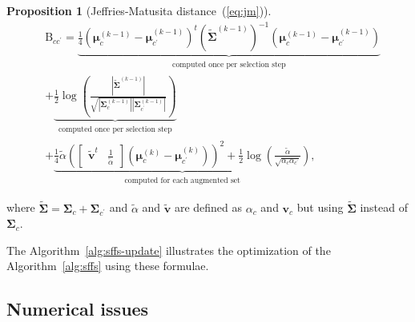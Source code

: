 \documentclass[journal,10pt]{IEEEtran}
\newtheorem{prop}{Proposition}
\begin{document}
      \begin{prop}[Jeffries-Matusita distance~(\ref{eq:jm})]
      \begin{align}
        \label{eq:jm-update}
            &\text{B}_{cc^\prime} = \underbrace{\frac{1}{4} (\boldsymbol{\mu}_c^{(k-1)} - \boldsymbol{\mu}_{c^\prime}^{(k-1)})^t ( \boldsymbol{\tilde{\Sigma}}^{(k-1)} )^{-1} (\boldsymbol{\mu}_c^{(k-1)} - \boldsymbol{\mu}_{c^\prime}^{(k-1)})}_{\substack{\text{computed once per selection step}}} \nonumber \\
            &+ \underbrace{\frac{1}{2} \log \left( \frac{|\boldsymbol{\tilde{\Sigma}}^{(k-1)}|}{\sqrt{|\boldsymbol{\Sigma}_c^{(k-1)}| |\boldsymbol{\Sigma}_{c^\prime}^{(k-1)}|}} \right)}_{\substack{\text{computed once per selection step}}} \nonumber \\
            &+ \underbrace{\frac{1}{4} \tilde{\alpha} ( \left[\begin{array}{cc} \mathbf{\tilde{v}}^t & \frac{1}{\tilde{\alpha}} \end{array}\right] (\boldsymbol{\mu}_c^{(k)} - \boldsymbol{\mu}_{c^\prime}^{(k)}) )^2 + \frac{1}{2} \log \left( \frac{\tilde{\alpha}}{\sqrt{\alpha_c \alpha_{c^\prime}}} \right)}_{\substack{\text{computed for each augmented set}}},
      \end{align}
    \end{prop}
    \noindent where $\boldsymbol{\tilde{\Sigma}} = \boldsymbol{\Sigma}_c + \boldsymbol{\Sigma}_{c^\prime}$ and $\tilde{\alpha}$ and $\mathbf{\tilde{v}}$ are defined as $\alpha_c$ and $\mathbf{v}_c$ but using $\boldsymbol{\tilde{\Sigma}}$ instead of $\boldsymbol{\Sigma}_c$.
    
    The  Algorithm~\ref{alg:sffs-update} illustrates  the optimization
    of the Algorithm~\ref{alg:sffs} using these formulae.

    \subsection{Numerical issues}
\end{document}
